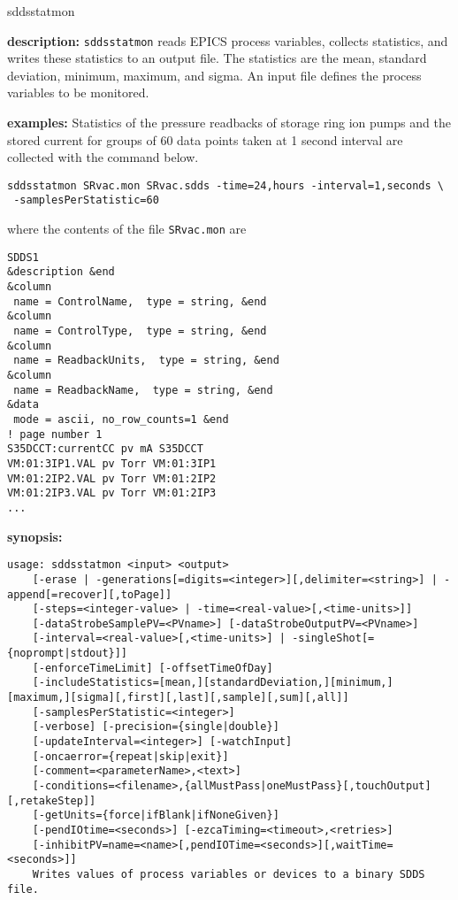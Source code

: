 \begin{sddsprog}{sddsstatmon}
\item \textbf{description:}
\verb+sddsstatmon+ reads EPICS process variables, collects statistics,
and writes these statistics to an output file.
The statistics are the mean, standard deviation, minimum, maximum, and sigma.
An input file defines the process variables to be monitored.
\item \textbf{examples:} 
% 
Statistics of the pressure readbacks of storage ring ion pumps and the stored current 
for groups of 60 data points taken at 1 second interval are collected
with the command below.
\begin{verbatim}
sddsstatmon SRvac.mon SRvac.sdds -time=24,hours -interval=1,seconds \
 -samplesPerStatistic=60
\end{verbatim}
where the contents of the file \verb+SRvac.mon+ are
\begin{verbatim}
SDDS1
&description &end
&column
 name = ControlName,  type = string, &end
&column
 name = ControlType,  type = string, &end
&column
 name = ReadbackUnits,  type = string, &end
&column
 name = ReadbackName,  type = string, &end
&data
 mode = ascii, no_row_counts=1 &end
! page number 1
S35DCCT:currentCC pv mA S35DCCT
VM:01:3IP1.VAL pv Torr VM:01:3IP1
VM:01:2IP2.VAL pv Torr VM:01:2IP2 
VM:01:2IP3.VAL pv Torr VM:01:2IP3 
...
\end{verbatim}
\item \textbf{synopsis:} 
\begin{verbatim}
usage: sddsstatmon <input> <output>
    [-erase | -generations[=digits=<integer>][,delimiter=<string>] | -append[=recover][,toPage]]
    [-steps=<integer-value> | -time=<real-value>[,<time-units>]]
    [-dataStrobeSamplePV=<PVname>] [-dataStrobeOutputPV=<PVname>]
    [-interval=<real-value>[,<time-units>] | -singleShot[={noprompt|stdout}]]
    [-enforceTimeLimit] [-offsetTimeOfDay]
    [-includeStatistics=[mean,][standardDeviation,][minimum,][maximum,][sigma][,first][,last][,sample][,sum][,all]]
    [-samplesPerStatistic=<integer>]
    [-verbose] [-precision={single|double}]
    [-updateInterval=<integer>] [-watchInput]
    [-oncaerror={repeat|skip|exit}]
    [-comment=<parameterName>,<text>]
    [-conditions=<filename>,{allMustPass|oneMustPass}[,touchOutput][,retakeStep]]
    [-getUnits={force|ifBlank|ifNoneGiven}]
    [-pendIOtime=<seconds>] [-ezcaTiming=<timeout>,<retries>]
    [-inhibitPV=name=<name>[,pendIOTime=<seconds>][,waitTime=<seconds>]]
    Writes values of process variables or devices to a binary SDDS file.

\end{verbatim}
\end{sddsprog}
